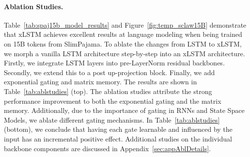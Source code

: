 \documentclass[dvipsnames]{article}
\begin{document}
\paragraph{Ablation Studies.}
Table~\ref{tab:spaj15b_model_results} and Figure~\ref{fig:temp_sclaw15B} demonstrate that
xLSTM achieves excellent results at language modeling
when being trained on 15B tokens from SlimPajama.
To ablate the changes from
LSTM to xLSTM, we morph a vanilla LSTM architecture step-by-step into an xLSTM architecture.
Firstly, we integrate LSTM layers into pre-LayerNorm residual backbones. Secondly, we extend this to a post up-projection block. Finally, we add exponential gating and matrix memory.
The results are shown in Table~\ref{tab:ablstudies} (top).
The ablation studies attribute the strong performance improvement
to both the exponential gating and the matrix memory. Additionally, due to the importance of gating in
RNNs and State Space Models, we ablate different gating mechanisms.
In Table~\ref{tab:ablstudies} (bottom), we conclude that having each gate learnable and
influenced by the input has an incremental positive effect. Additional
studies on the individual backbone components are discussed in Appendix~\ref{sec:appAblDetails}.
\end{document}
